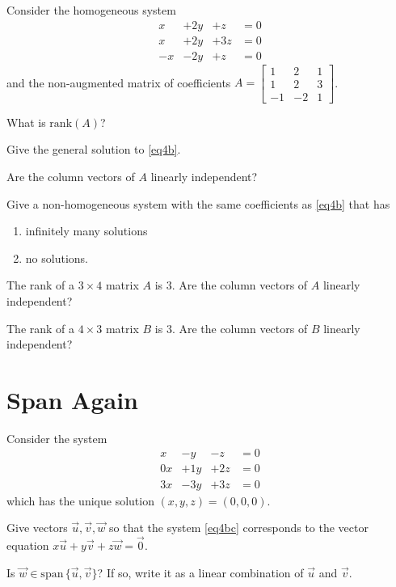 \documentclass{problemset}
\newcommand{\Span}{\mathrm{span}\,}
\newcommand{\Rank}{\mathrm{rank}}
\newcommand{\mat}[1]{\begin{bmatrix}#1\end{bmatrix}}
\begin{document}
	\question
	Consider the homogeneous system 
		\begin{equation}\label{eq4b}
			\begin{array}{llll}
				x&+2y&+z &= 0\\
				x&+2y&+3z &= 0\\
				-x&-2y&+z &= 0
			\end{array}
		\end{equation}
	and the non-augmented matrix of coefficients $A=\mat{1&2&1\\1&2&3\\-1&-2&1}$.
	\begin{parts}
		\item What is $\Rank(A)$?
		\item Give the general solution to \eqref{eq4b}.
		\item Are the column vectors of $A$ linearly independent?
		\item Give a non-homogeneous system with the same coefficients as \eqref{eq4b} that has
			\begin{enumerate}
				\item infinitely many solutions
				\item no solutions.
			\end{enumerate}
	\end{parts}

	\question
	\begin{parts}
		\item The rank of a $3\times 4$ matrix $A$ is $3$.  Are the column vectors of $A$ linearly independent?
		\item The rank of a $4\times 3$ matrix $B$ is $3$.  Are the column vectors of $B$ linearly independent?
	\end{parts}

\section*{Span Again}
	\question
	Consider the system 
		\begin{equation}\label{eq4bc}
			\begin{array}{llll}
				x&-y&-z &= 0\\
				0x&+1y&+2z &= 0\\
				3x&-3y&+3z &= 0
			\end{array}
		\end{equation}
	which has the unique solution $(x,y,z)=(0,0,0)$.
	\begin{parts}
		\item Give vectors $\vec u,\vec v,\vec w$ so that the system \eqref{eq4bc}
			corresponds to the vector equation $x\vec u+y\vec v+z\vec w = \vec 0$.
		\item Is $\vec w\in\Span\{\vec u,\vec v\}$? If so, write it as a linear combination
			of $\vec u$ and $\vec v$.
	\end{parts}
\end{document}
